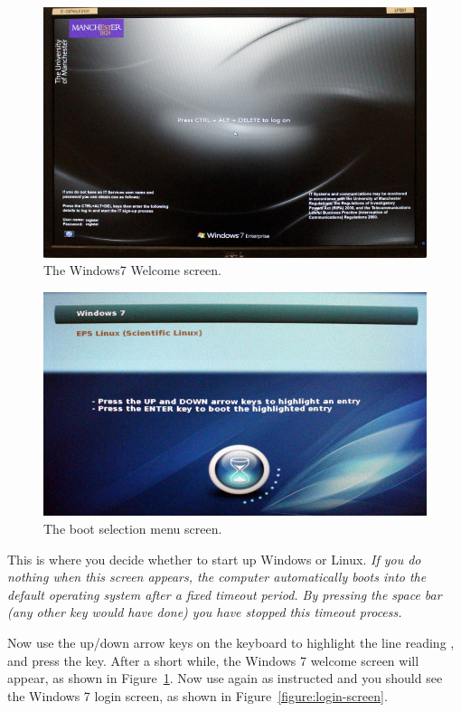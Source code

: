\begin{figure}
\centerline{\includegraphics[width=15cm]{images/TH-win-welcome}}
\caption{The Windows7 Welcome screen.}
\label{figure:welc-screen}
\end{figure}

\begin{figure}
\centerline{\includegraphics[width=15cm]{images/TH-grub-win}}
\caption{The boot selection menu screen.}
\label{figure:welc-grub}
\end{figure}

This is where you decide whether to start up Windows or Linux. \emph{If you do nothing when this screen appears, the computer automatically boots into the default operating system after a fixed timeout period. By pressing the space bar (any other key would have done) you have stopped this timeout process. }

Now use the
up/down arrow keys on the keyboard to highlight the line
reading , and press the  key. After a short while, the Windows 7
welcome screen will appear, as shown in Figure~\ref{figure:welc-screen}. Now use   again as instructed and you should see the Windows 7 login screen, as shown in Figure~\ref{figure:login-screen}.

